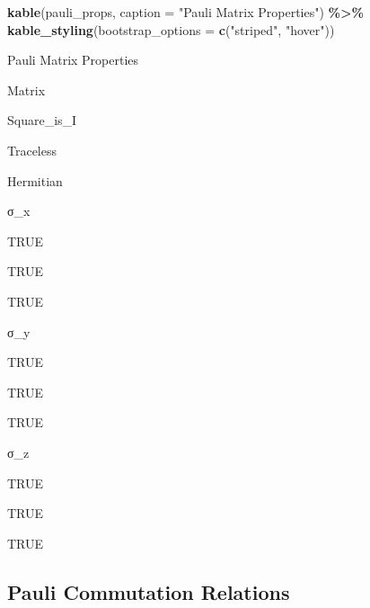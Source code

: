 \documentclass[
]{book}
\newenvironment{Shaded}{\begin{snugshade}}{\end{snugshade}}
\newcommand{\AttributeTok}[1]{\textcolor[rgb]{0.13,0.29,0.53}{#1}}
\newcommand{\FunctionTok}[1]{\textcolor[rgb]{0.13,0.29,0.53}{\textbf{#1}}}
\newcommand{\NormalTok}[1]{#1}
\newcommand{\SpecialCharTok}[1]{\textcolor[rgb]{0.81,0.36,0.00}{\textbf{#1}}}
\newcommand{\StringTok}[1]{\textcolor[rgb]{0.31,0.60,0.02}{#1}}
\theoremstyle{definition}
\theoremstyle{definition}
\theoremstyle{definition}
\theoremstyle{definition}
\theoremstyle{remark}
\begin{document}
\begin{Shaded}
\begin{Highlighting}[]
\FunctionTok{kable}\NormalTok{(pauli\_props,}
      \AttributeTok{caption =} \StringTok{"Pauli Matrix Properties"}\NormalTok{) }\SpecialCharTok{\%\textgreater{}\%}
  \FunctionTok{kable\_styling}\NormalTok{(}\AttributeTok{bootstrap\_options =} \FunctionTok{c}\NormalTok{(}\StringTok{"striped"}\NormalTok{, }\StringTok{"hover"}\NormalTok{))}
\end{Highlighting}
\end{Shaded}

\label{tab:pauli-matrices2}Pauli Matrix Properties

Matrix

Square\_is\_I

Traceless

Hermitian

σ\_x

TRUE

TRUE

TRUE

σ\_y

TRUE

TRUE

TRUE

σ\_z

TRUE

TRUE

TRUE

\subsection{Pauli Commutation Relations}\label{pauli-commutation-relations}
\end{document}
